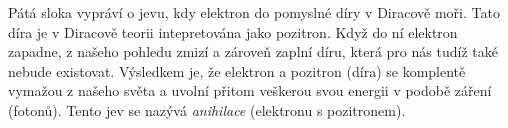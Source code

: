 \documentclass{../../../../style/mkimain}
\begin{document}
\noindent{}
\klein
Pátá sloka vypráví o jevu, kdy elektron  do pomyslné díry v Diracově moři.
Tato díra je v Diracově teorii intepretována jako pozitron. Když do ní elektron zapadne,
z našeho pohledu zmizí a zároveň zaplní díru, která pro nás tudíž také nebude existovat. Výsledkem je,
že elektron a pozitron (díra) se komplentě vymažou z našeho světa
a uvolní přitom veškerou svou energii v podobě záření (fotonů). Tento jev se nazývá \emph{anihilace} (elektronu s pozitronem).
\end{document}
